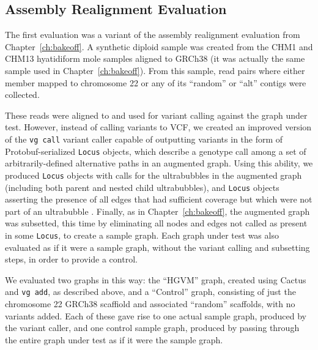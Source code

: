 \subsection{Assembly Realignment Evaluation}

The first evaluation was a variant of the assembly realignment evaluation from Chapter~\ref{ch:bakeoff}. A synthetic diploid sample was created from the CHM1 and CHM13 hyatidiform mole samples aligned to GRCh38 (it was actually the same sample used in Chapter~\ref{ch:bakeoff}). From this sample, read pairs where either member mapped to chromosome 22 or any of its ``random'' or ``alt'' contigs were collected. 

These reads were aligned to and used for variant calling against the graph under test. However, instead of calling variants to VCF, we created an improved version of the \texttt{vg call} variant caller capable of outputting variants in the form of Protobuf-serialized \texttt{Locus} objects, which describe a genotype call among a set of arbitrarily-defined alternative paths in an augmented graph. Using this ability, we produced \texttt{Locus} objects with calls for the ultrabubbles in the augmented graph (including both parent and nested child ultrabubbles), and \texttt{Locus} objects asserting the presence of all edges that had sufficient coverage but which were not part of an ultrabubble \cite{paten2017superbubbles}. Finally, as in Chapter~\ref{ch:bakeoff}, the augmented graph was subsetted, this time by eliminating all nodes and edges not called as present in some \texttt{Locus}, to create a sample graph. Each graph under test was also evaluated as if it were a sample graph, without the variant calling and subsetting steps, in order to provide a control.

We evaluated two graphs in this way: the ``HGVM'' graph, created using Cactus and \texttt{vg add}, as described above, and a ``Control'' graph, consisting of just the chromosome 22 GRCh38 scaffiold and associated ``random'' scaffolds, with no variants added. Each of these gave rise to one actual sample graph, produced by the variant caller, and one control sample graph, produced by passing through the entire graph under test as if it were the sample graph.

